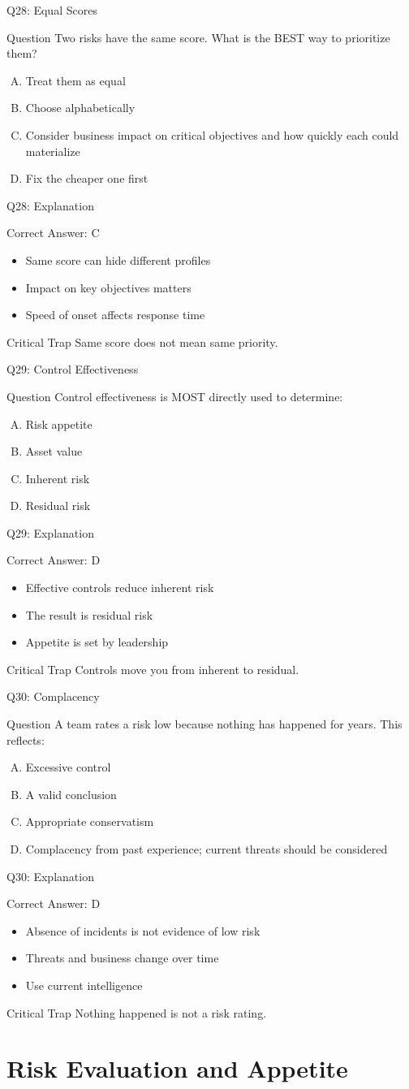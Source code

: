 \documentclass[aspectratio=169]{beamer}
\newcommand{\hq}[7]{%
	\begin{frame}{Q#1: #2}
		\begin{block}{Question}
			#3
		\end{block}
		\begin{enumerate}[(A)]
			#4
		\end{enumerate}
	\end{frame}
	\begin{frame}{Q#1: Explanation}
		\begin{block}{Correct Answer: #5}
			\begin{itemize}
				#6
			\end{itemize}
		\end{block}
		\begin{alertblock}{Critical Trap}
			#7
		\end{alertblock}
	\end{frame}
}
\begin{document}
	\hq{28}{Equal Scores}
	{Two risks have the same score. What is the BEST way to prioritize them?}
	{\item Treat them as equal
		\item Choose alphabetically
		\item Consider business impact on critical objectives and how quickly each could materialize
		\item Fix the cheaper one first}
	{C}
	{\item Same score can hide different profiles
		\item Impact on key objectives matters
		\item Speed of onset affects response time}
	{Same score does not mean same priority.}
	
	\hq{29}{Control Effectiveness}
	{Control effectiveness is MOST directly used to determine:}
	{\item Risk appetite
		\item Asset value
		\item Inherent risk
		\item Residual risk}
	{D}
	{\item Effective controls reduce inherent risk
		\item The result is residual risk
		\item Appetite is set by leadership}
	{Controls move you from inherent to residual.}
	
	\hq{30}{Complacency}
	{A team rates a risk low because nothing has happened for years. This reflects:}
	{\item Excessive control
		\item A valid conclusion
		\item Appropriate conservatism
		\item Complacency from past experience; current threats should be considered}
	{D}
	{\item Absence of incidents is not evidence of low risk
		\item Threats and business change over time
		\item Use current intelligence}
	{Nothing happened is not a risk rating.}
	
	\section{Risk Evaluation and Appetite}
	
\end{document}
